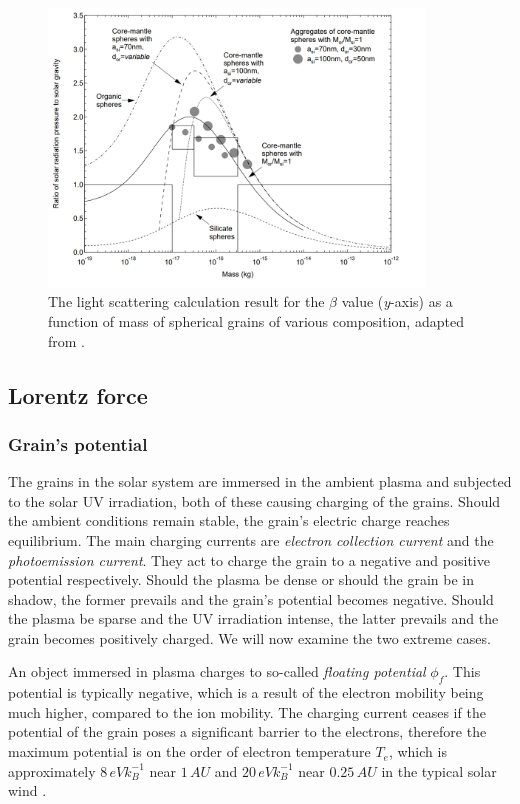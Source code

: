 \begin{figure}[h]
 	\centering
 	\includegraphics[width=10cm]{figures/kimurra_mie.png}
 	\caption{The light scattering calculation result for the $\beta$ value (\textit{y}-axis) as a function of mass of spherical grains of various composition, adapted from \cite{kimura2003composition}.}
 	\label{fig:kimura_mie}
\end{figure}

\subsection{Lorentz force}

\subsubsection{Grain's potential}

The grains in the solar system are immersed in the ambient plasma and subjected to the solar UV irradiation, both of these causing charging of the grains. Should the ambient conditions remain stable, the grain's electric charge reaches equilibrium. The main charging currents are \textit{electron collection current} and the \textit{photoemission current}. They act to charge the grain to a negative and positive potential respectively. Should the plasma be dense or should the grain be in shadow, the former prevails and the grain's potential becomes negative. Should the plasma be sparse and the UV irradiation intense, the latter prevails and the grain becomes positively charged. We will now examine the two extreme cases. 

An object immersed in plasma charges to so-called \textit{floating potential} $\phi_{f}$. This potential is typically negative, which is a result of the electron mobility being much higher, compared to the ion mobility. The charging current ceases if the potential of the grain poses a significant barrier to the electrons, therefore the maximum potential is on the order of electron temperature $T_e$, which is approximately $8 \, \si{eV k_B^{-1}}$ near $1 \, \si{AU}$ and $20 \, \si{eV k_B^{-1}}$ near $0.25 \, \si{AU}$ in the typical solar wind \citep{guillemant2013simulation}. 

